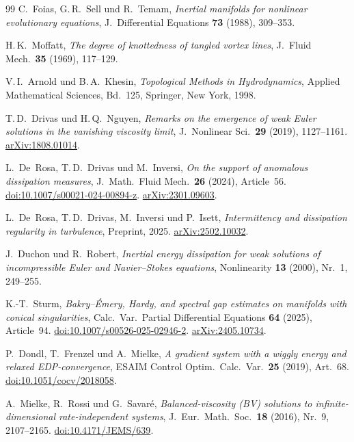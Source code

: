 \documentclass[12pt,a4paper]{article}
\theoremstyle{definition}
\theoremstyle{plain}
\theoremstyle{remark}
\begin{document}
\begin{thebibliography}{99}
C.~Foias, G.\,R.~Sell und R.~Temam,
\emph{Inertial manifolds for nonlinear evolutionary equations},
J.~Differential Equations \textbf{73} (1988), 309--353.

H.\,K.~Moffatt,
\emph{The degree of knottedness of tangled vortex lines},
J.~Fluid Mech.\ \textbf{35} (1969), 117--129.

V.\,I.~Arnold und B.\,A.~Khesin,
\emph{Topological Methods in Hydrodynamics},
Applied Mathematical Sciences, Bd.~125,
Springer, New York, 1998.

T.\,D.~Drivas und H.\,Q.~Nguyen,
\emph{Remarks on the emergence of weak Euler solutions in the vanishing
viscosity limit},
J.~Nonlinear Sci.\ \textbf{29} (2019), 1127--1161.
\href{https://arxiv.org/abs/1808.01014}{arXiv:1808.01014}.

L.~De~Rosa, T.\,D.~Drivas und M.~Inversi,
\emph{On the support of anomalous dissipation measures},
J.~Math.\ Fluid Mech.\ \textbf{26} (2024), Article~56.
\href{https://doi.org/10.1007/s00021-024-00894-z}{doi:10.1007/s00021-024-00894-z}.
\href{https://arxiv.org/abs/2301.09603}{arXiv:2301.09603}.

L.~De~Rosa, T.\,D.~Drivas, M.~Inversi und P.~Isett,
\emph{Intermittency and dissipation regularity in turbulence},
Preprint, 2025.
\href{https://arxiv.org/abs/2502.10032}{arXiv:2502.10032}.

J.~Duchon und R.~Robert,
\emph{Inertial energy dissipation for weak solutions of incompressible Euler and Navier--Stokes equations},
Nonlinearity \textbf{13} (2000), Nr.~1, 249--255.

K.-T.~Sturm,
\emph{Bakry--\'Emery, Hardy, and spectral gap estimates on manifolds with conical singularities},
Calc.\ Var.\ Partial Differential Equations \textbf{64} (2025), Article~94.
\href{https://doi.org/10.1007/s00526-025-02946-2}{doi:10.1007/s00526-025-02946-2}.
\href{https://arxiv.org/abs/2405.10734}{arXiv:2405.10734}.

P.~Dondl, T.~Frenzel und A.~Mielke,
\emph{A gradient system with a wiggly energy and relaxed EDP-convergence},
ESAIM Control Optim.\ Calc.\ Var.\ \textbf{25} (2019), Art.~68.
\href{https://doi.org/10.1051/cocv/2018058}{doi:10.1051/cocv/2018058}.

A.~Mielke, R.~Rossi und G.~Savar\'e,
\emph{Balanced-viscosity (BV) solutions to infinite-dimensional rate-independent systems},
J.~Eur.\ Math.\ Soc.\ \textbf{18} (2016), Nr.~9, 2107--2165.
\href{https://doi.org/10.4171/JEMS/639}{doi:10.4171/JEMS/639}.


\end{thebibliography}
\end{document}
